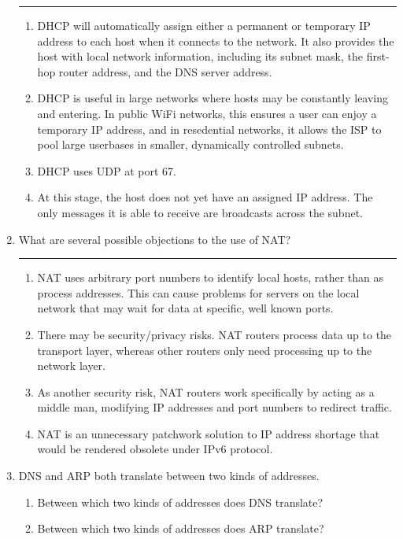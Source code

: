 \documentclass[twoside]{article}
\newenvironment{answer}
  {\vspace*{0.2cm} \rule{12cm}{0.04cm} \vspace*{0.2cm}}
  {\vspace*{0.2cm}}
\begin{document}
\begin{enumerate}
\begin{answer}
  \begin{enumerate}
    \item DHCP will automatically assign either a permanent or temporary IP address to each host when it connects to the network. 
	It also provides the host with local network information, including its subnet mask, the first-hop router address, and the DNS server address.
    \item DHCP is useful in large networks where hosts may be constantly leaving and entering. In public WiFi networks, this ensures a user can enjoy a temporary
	IP address, and in resedential networks, it allows the ISP to pool large userbases in smaller, dynamically controlled subnets.
    \item DHCP uses UDP at port 67.
    \item At this stage, the host does not yet have an assigned IP address. The only messages it is able to receive are broadcasts across the subnet.
    \end{enumerate}

    \end{answer}

  \item What are several possible objections to the use of NAT?

  \begin{answer}

  \begin{enumerate}
    \item NAT uses arbitrary port numbers to identify local hosts, rather than as process addresses. This can cause problems for servers
	on the local network that may wait for data at specific, well known ports.
    \item There may be security/privacy risks. NAT routers process data up to the transport layer, whereas other routers only need processing
	up to the network layer.
    \item As another security risk, NAT routers work specifically by acting as a middle man, modifying IP addresses and port numbers to
	redirect traffic. 
    \item NAT is an unnecessary patchwork solution to IP address shortage that would be rendered obsolete under IPv6 protocol.
    \end{enumerate}

    \end{answer}

  \item DNS and ARP both translate between two kinds of addresses.
  \begin{enumerate}
    \item Between which two kinds of addresses does DNS translate?
    \item Between which two kinds of addresses does ARP translate?
    \end{enumerate}


\end{enumerate}
\end{document}
